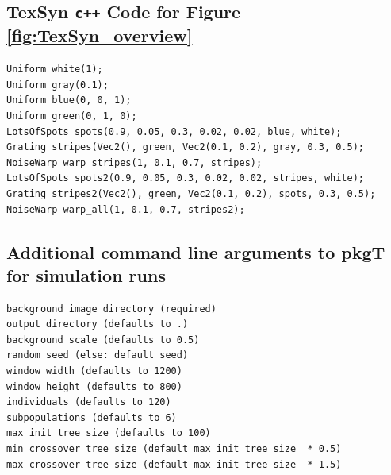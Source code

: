 \documentclass[letterpaper]{article}
\newcommand{\texsyn}[0]{TexSyn}
\begin{document}
\subsection{\texsyn{} \texttt{c++} Code for Figure \ref{fig:TexSyn_overview}}
\begin{minipage}{\linewidth}
\hspace*{1cm}
\begin{minipage}{\linewidth-1.1cm}
\begin{small}
\begin{verbatim}
Uniform white(1);
Uniform gray(0.1);
Uniform blue(0, 0, 1);
Uniform green(0, 1, 0);
LotsOfSpots spots(0.9, 0.05, 0.3, 0.02, 0.02, blue, white);
Grating stripes(Vec2(), green, Vec2(0.1, 0.2), gray, 0.3, 0.5);
NoiseWarp warp_stripes(1, 0.1, 0.7, stripes);
LotsOfSpots spots2(0.9, 0.05, 0.3, 0.02, 0.02, stripes, white);
Grating stripes2(Vec2(), green, Vec2(0.1, 0.2), spots, 0.3, 0.5);
NoiseWarp warp_all(1, 0.1, 0.7, stripes2);
\end{verbatim}
\end{small}
\end{minipage}
\end{minipage}

\subsection{Additional command line arguments to pkgT for simulation runs}
\begin{minipage}{\linewidth-1.1cm}
\begin{small}
\hspace*{1cm}
\begin{minipage}{\linewidth-1.1cm}
\begin{verbatim}
background image directory (required)
output directory (defaults to .)
background scale (defaults to 0.5)
random seed (else: default seed)
window width (defaults to 1200)
window height (defaults to 800)
individuals (defaults to 120)
subpopulations (defaults to 6)
max init tree size (defaults to 100)
min crossover tree size (default max init tree size  * 0.5)
max crossover tree size (default max init tree size  * 1.5)
\end{verbatim}
\end{minipage}
\end{small}
\end{minipage}
\end{document}

